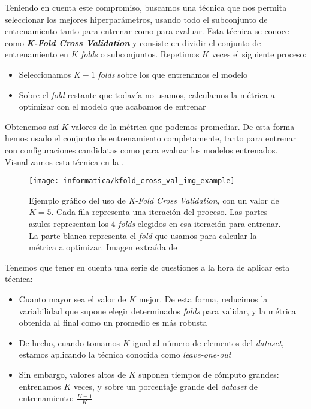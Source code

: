Teniendo en cuenta este compromiso, buscamos una técnica que nos permita seleccionar los mejores hiperparámetros, usando todo el subconjunto de entrenamiento tanto para entrenar como para evaluar. Esta técnica se conoce como \textbf{\textit{K-Fold Cross Validation}} \cite{informatica:kfold_cross_val_paper} y consiste en dividir el conjunto de entrenamiento en $K$ \textit{folds} o subconjuntos. Repetimos $K$ veces el siguiente proceso:

\begin{itemize}
    \item Seleccionamos $K-1$ \textit{folds} sobre los que entrenamos el modelo
    \item Sobre el \textit{fold} restante que todavía no usamos, calculamos la métrica a optimizar con el modelo que acabamos de entrenar
\end{itemize}

Obtenemos así $K$ valores de la métrica que podemos promediar. De esta forma hemos usado el conjunto de entrenamiento completamente, tanto para entrenar con configuraciones candidatas como para evaluar los modelos entrenados. Visualizamos esta técnica en la .

\begin{figure}[h]
    \centering
    \texttt{[image: informatica/kfold\_cross\_val\_img\_example]}
    \caption{Ejemplo gráfico del uso de \textit{K-Fold Cross Validation}, con un valor de $K = 5$. Cada fila representa una iteración del proceso. Las partes azules representan los 4 \textit{folds} elegidos en esa iteración para entrenar. La parte blanca representa el \textit{fold} que usamos para calcular la métrica a optimizar. Imagen extraída de \cite{informatica:kfold_cross_val_img_web}}
    \label{img:visualizacion_kfold_cv}
\end{figure}

Tenemos que tener en cuenta una serie de cuestiones a la hora de aplicar esta técnica:

\begin{itemize}
    \item Cuanto mayor sea el valor de $K$ mejor. De esta forma, reducimos la variabilidad que supone elegir determinados \textit{folds} para validar, y la métrica obtenida al final como un promedio es más robusta
    \item De hecho, cuando tomamos $K$ igual al número de elementos del \textit{dataset}, estamos aplicando la técnica conocida como \textit{leave-one-out} \cite{informatica:kfold_cross_val_paper}
    \item Sin embargo, valores altos de $K$ suponen tiempos de cómputo grandes: entrenamos $K$ veces, y sobre un porcentaje grande del \textit{dataset} de entrenamiento: $\frac{K - 1}{K}$
\end{itemize}

